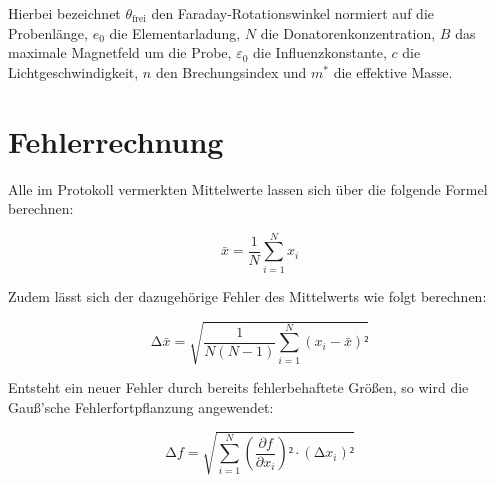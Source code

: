 \noindent Hierbei bezeichnet $\theta_\text{frei}$ den Faraday-Rotationswinkel normiert auf die Probenlänge, $e_0$ die Elementarladung, $N$ die Donatorenkonzentration,
$B$ das maximale Magnetfeld um die Probe, $\varepsilon_0$ die Influenzkonstante, $c$ die Lichtgeschwindigkeit, $n$ den 
Brechungsindex und $m^{\ast}$ die effektive Masse.

\section{Fehlerrechnung}
\label{sec:Fehlerrechnung}

Alle im Protokoll vermerkten Mittelwerte lassen sich über die folgende Formel berechnen:

\begin{equation}
\label{eqn:Mittelwert}
    \bar{x} = \frac{1}{N}\sum_{i=1}^N x_i
\end{equation}

\noindent Zudem lässt sich der dazugehörige Fehler des Mittelwerts wie folgt berechnen:

\begin{equation}
\label{eqn:Mittelwertfehler}
    \increment \bar{x} = \sqrt{\frac{1}{N\left(N-1\right)}\sum_{i=1}^N \left(x_i - \bar{x}\right)²}
\end{equation}

\noindent Entsteht ein neuer Fehler durch bereits fehlerbehaftete Größen, so wird die Gauß'sche Fehlerfortpflanzung angewendet:

\begin{equation}
\label{eqn:Fehlerfortpflanzung}
    \increment f = \sqrt{\sum_{i=1}^N \left(\frac{\partial f}{\partial x_i}\right)²\cdot\left(\increment x_i\right)²}
\end{equation}

%
